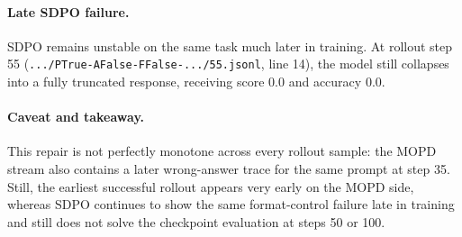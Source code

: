\paragraph{Late SDPO failure.}
SDPO remains unstable on the same task much later in training.
At rollout step 55
(\texttt{.../PTrue-AFalse-FFalse-.../55.jsonl}, line 14), the model still
collapses into a fully truncated response, receiving score $0.0$ and accuracy
$0.0$.

\paragraph{Caveat and takeaway.}
This repair is not perfectly monotone across every rollout sample:
the MOPD stream also contains a later wrong-answer trace for the same prompt at
step 35.
Still, the earliest successful rollout appears very early on the MOPD side,
whereas SDPO continues to show the same format-control failure late in training
and still does not solve the checkpoint evaluation at steps 50 or 100.
